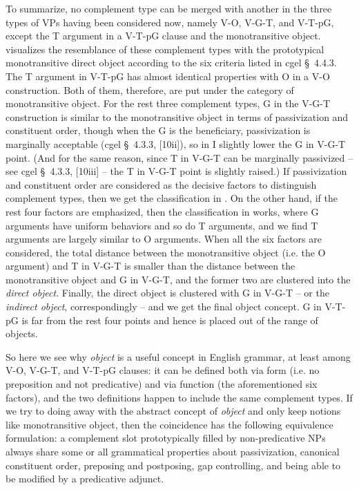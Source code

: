 \documentclass{article}
\newcommand*{\citesec}[1]{\S~{#1}}
\newcommand*{\term}[1]{\emph{#1}}
\begin{document}
To summarize, no complement type can be merged with another  
in the three types of VPs having been considered now,
namely V-O, V-G-T, and V-T-pG,
except the T argument in a V-T-pG clause and the monotransitive object.
 visualizes the resemblance 
of these complement types with the prototypical monotransitive direct object 
according to the six criteria listed in \ac{cgel} \citesec{4.4.3}.
The T argument in V-T-pG has almost identical properties
with O in a V-O construction.
Both of them, therefore, are put under the category of monotransitive object.
For the rest three complement types,
G in the V-G-T construction is similar to the monotransitive object 
in terms of passivization and constituent order,
though when the G is the beneficiary,
passivization is marginally acceptable (\ac{cgel} \citesec{4.3.3}, [10ii]),
so in  I slightly lower the G in V-G-T point.
(And for the same reason, since T in V-G-T can be marginally passivized 
-- see \ac{cgel} \citesec{4.3.3}, [10iii] --
the T in V-G-T point is slightly raised.)
If passivization and constituent order are considered as the decisive factors to distinguish complement types,
then we get the classification in .
On the other hand, if the rest four factors are emphasized,
then the classification in  works,
where G arguments have uniform behaviors 
and so do T arguments,
and we find T arguments are largely similar to O arguments.
When all the six factors are considered,
the total distance between the monotransitive object (i.e. the O argument)
and T in V-G-T is smaller than 
the distance between the monotransitive object and G in V-G-T,
and the former two are clustered into the \term{direct object}.
Finally, the direct object is clustered with G in V-G-T 
-- or the \term{indirect object}, correspondingly -- 
and we get the final object concept.
G in V-T-pG is far from the rest four points 
and hence is placed out of the range of objects.

So here we see why \term{object} is a useful concept in English grammar,
at least among V-O, V-G-T, and V-T-pG clauses:
it can be defined both via form (i.e. no preposition and not predicative)
and via function (the aforementioned six factors),
and the two definitions happen to include the same complement types.
If we try to doing away with the abstract concept of \term{object}
and only keep notions like monotransitive object,
then the coincidence has the following equivalence formulation:
a complement slot prototypically filled by non-predicative NPs
always share some or all grammatical properties
about passivization, canonical constituent order,
preposing and postposing, gap controlling, 
and being able to be modified by a predicative adjunct. 
\end{document}
